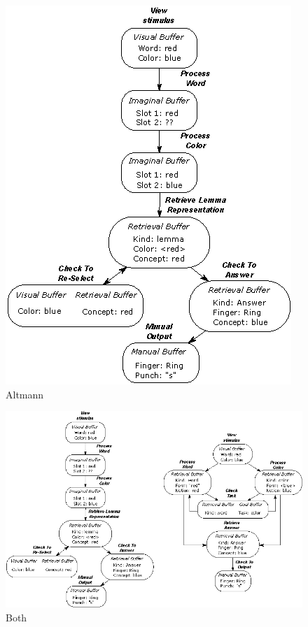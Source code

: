 \documentclass[10pt,letterpaper]{article}
\begin{document}
\begin{figure}[ht]
\centering
  \includegraphics[width=\linewidth]{altmann_model.eps}
  \caption{Altmann}
\end{figure}%

\begin{figure}[ht]
 \centering
  \includegraphics[width=\textwidth]{both_models.eps}
  \caption{Both}
\end{figure}%
 
\end{document}
